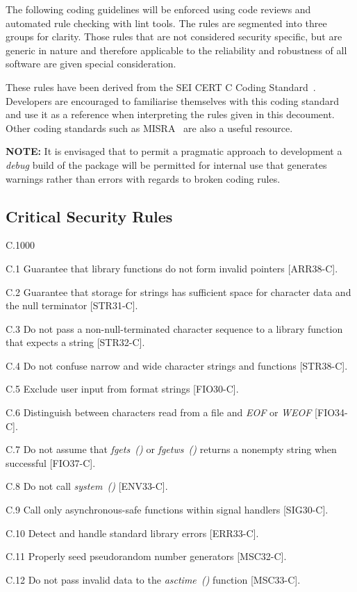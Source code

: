 The following coding guidelines will be enforced using code reviews and automated rule checking with lint tools. The rules are segmented into three groups for clarity. Those rules that are not considered security specific, but are generic in nature and therefore applicable to the reliability and robustness of all software are given special consideration.

These rules have been derived from the SEI CERT C Coding Standard~\cite{sei_cert}. Developers are encouraged to familiarise themselves with this coding standard and use it as a reference when interpreting the rules given in this decoument. Other coding standards such as MISRA~\cite{misra_c} are also a useful resource.

\textbf{NOTE:} It is envisaged that to permit a pragmatic approach to development a \textit{debug} build of the package will be permitted for internal use that generates warnings rather than errors with regards to broken coding rules.

\subsection{Critical Security Rules}

\begin{labeling}{C.1000}
\item [C.1] Guarantee that library functions do not form invalid pointers [ARR38-C].
\item [C.2] Guarantee that storage for strings has sufficient space for character data and the null terminator [STR31-C].
\item [C.3] Do not pass a non-null-terminated character sequence to a library function that expects a string [STR32-C].
\item [C.4] Do not confuse narrow and wide character strings and functions [STR38-C].
\item [C.5] Exclude user input from format strings [FIO30-C].
\item [C.6] Distinguish between characters read from a file and \textit{EOF} or \textit{WEOF} [FIO34-C].
\item [C.7] Do not assume that \textit{fgets~()} or \textit{fgetws~()} returns a nonempty string when successful [FIO37-C].
\item [C.8] Do not call \textit{system~()} [ENV33-C].
\item [C.9] Call only asynchronous-safe functions within signal handlers [SIG30-C].
\item [C.10] Detect and handle standard library errors [ERR33-C].
\item [C.11] Properly seed pseudorandom number generators [MSC32-C].
\item [C.12] Do not pass invalid data to the \textit{asctime~()} function [MSC33-C].
\end{labeling}


